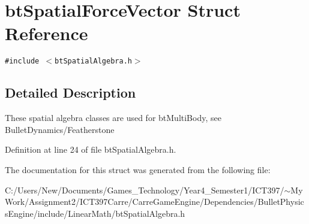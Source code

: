 \hypertarget{structbt_spatial_force_vector}{
\section{btSpatialForceVector Struct Reference}
\label{structbt_spatial_force_vector}
}
{\tt \#include $<$btSpatialAlgebra.h$>$}



\subsection{Detailed Description}
These spatial algebra classes are used for btMultiBody, see BulletDynamics/Featherstone 

Definition at line 24 of file btSpatialAlgebra.h.

The documentation for this struct was generated from the following file:\begin{CompactItemize}
\item 
C:/Users/New/Documents/Games\_\-Technology/Year4\_\-Semester1/ICT397/$\sim$My Work/Assignment2/ICT397Carre/CarreGameEngine/Dependencies/BulletPhysicsEngine/include/LinearMath/btSpatialAlgebra.h\end{CompactItemize}
